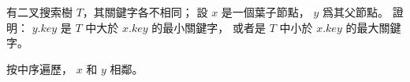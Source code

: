 \startEXERCISE
有二叉搜索樹 $T$，其關鍵字各不相同；
設 $x$ 是一個葉子節點， $y$ 爲其父節點。
證明： $y.key$ 是 $T$ 中大於 $x.key$ 的最小關鍵字，
或者是 $T$ 中小於 $x.key$ 的最大關鍵字。
\stopEXERCISE

\startANSWER
按中序遍歷， $x$ 和 $y$ 相鄰。
\stopANSWER
